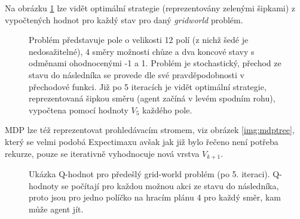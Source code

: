 Na obrázku \ref{img:policy} lze vidět optimální strategie (reprezentovány zelenými šipkami) z vypočtených hodnot pro každý stav pro daný \textit{gridworld} problém.

\begin{figure}[!htbp]
\begin{center}
  \caption{Problém představuje pole o velikosti 12 polí (z nichž šedé je nedosažitelné), 4 směry možnosti chůze a dva koncové stavy s odměnami ohodnocenými -1 a 1. Problém je stochastický, přechod ze stavu do následníka se provede dle své pravděpodobnosti v přechodové funkci. Již po 5 iteracích je vidět optimální strategie, reprezentovaná šipkou směru (agent začíná v levém spodním rohu), vypočtena pomocí hodnoty $V_{5}$ každého pole.}
  \label{img:policy}
\end{center}
\end{figure}

MDP lze též reprezentovat prohledávacím stromem, viz obrázek \ref{img:mdptree}, který se velmi podobá Expectimaxu avšak jak již bylo řečeno není potřeba rekurze, pouze se iterativně vyhodnocuje nová vrstva $V_{k+1}$.
\newpage

\begin{figure}[ht]
\begin{center}
  \caption{Ukázka Q-hodnot pro předešlý grid-world problém (po 5. iteraci). Q-hodnoty se počítají pro každou možnou akci ze stavu do následníka, proto jsou pro jedno políčko na hracím plánu 4 pro každý směr, kam může agent jít.}
  \label{img:qvals}
\end{center}
\end{figure}

